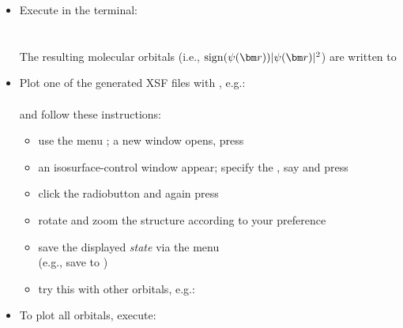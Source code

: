 \documentclass[landscape]{foils}
\begin{document}
\vspace{-0.5em}
\begin{itemize}
\item Execute in the terminal:\\[0.5em]
  \\
  \\[0.5em]
  {\small The resulting molecular orbitals (i.e., $\sign(\psi(\vr))|\psi(\vr)|^2$) are
  written to }

  \vspace{-0.5em}
\item Plot one of the generated XSF files with ,
  e.g.:\\[0.5em]
  \\[0.5em]
  and follow these instructions:
  \vspace{-0.5em}
  {\small
    \begin{itemize}
    \item use the menu ; a new window opens, press \file{[OK]}
    \item an isosurface-control window appear; specify the ,
      say  and press \file{[Submit]}
    \item click the  radiobutton and again
      press \file{[Submit]}
    \item rotate and zoom the structure according to your preference
    \item save the displayed {\em state} via the menu
      \\
      (e.g., save to )
    \item try this with other orbitals, e.g.:\\[0.3em]
      {\small {}}
    \end{itemize}
  }
  \vspace{-0.5em}
\item To plot all orbitals, execute: ~
\end{itemize}
\end{document}
